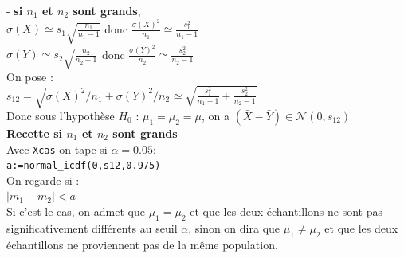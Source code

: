 \documentclass[a4paper,11pt]{book}
\begin{document}
- {\bf si $n_1$ et $n_2$ sont grands},\\
$\sigma(X) \simeq s_1\sqrt{\frac{n_1}{n_1-1}}$ donc 
$\frac{\sigma(X)^2}{n_1} \simeq \frac{s_1^2}{n_1-1}$\\
$\sigma(Y) \simeq s_2\sqrt{\frac{n_2}{n_2-1}}$ donc 
$\frac{\sigma(Y)^2}{n_2} \simeq \frac{s_2^2}{n_2-1}$\\
On pose :\\
$s_{12}=\sqrt{\sigma(X)^2/n_1+\sigma(Y)^2/n_2}\simeq \sqrt{\frac{s_1^2}{n_1-1}+\frac{s_2^2}{n_2-1}}$\\
Donc sous l'hypoth\`ese $H_0$ : $\mu_1=\mu_2=\mu$, on a 
$(\bar X-\bar Y) \in \mathcal N(0,s_{12})$\\ 
{\bf Recette si $n_1$ et $n_2$ sont grands}\\
Avec {\tt Xcas} on tape si $\alpha=0.05$:\\
{\tt a:=normal\_icdf(0,s12,0.975)}\\
On regarde si :\\
 $\displaystyle |m_1-m_2|<a$\\
Si c'est le cas, on admet que $\mu_1=\mu_2$ et que les deux \'echantillons ne 
sont pas significativement diff\'erents au seuil $\alpha$, sinon on dira que 
 $\mu_1 \neq \mu_2$ et que les deux \'echantillons ne proviennent pas de la 
m\^eme population. 
 
\end{document}
